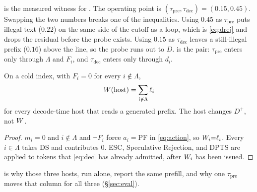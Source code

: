  is the measured witness for .
The operating point is $(\tau_{\mathrm{pre}},\tau_{\mathrm{dec}})=(0.15,0.45)$.
Swapping the two numbers breaks one of the inequalities.
Using $0.45$ as $\tau_{\mathrm{pre}}$ puts illegal text ($0.22$) on the same side of the cutoff as a loop, which is \eqref{eq:drej} and drops the residual before the probe exists.
Using $0.15$ as $\tau_{\mathrm{dec}}$ leaves a still-illegal prefix ($0.16$) above the line, so the probe runs out to $D$.
 is the pair: $\tau_{\mathrm{pre}}$ enters only through $\Lambda$ and $F_i$, and $\tau_{\mathrm{dec}}$ enters only through $d_i$.

\begin{proposition}
\label{prop:host}
On a cold index, with $F_i{=}0$ for every $i\notin\Lambda$,
\begin{equation}
\label{eq:host}
W(\mathrm{host})=\sum_{i\notin\Lambda}\ell_i
\end{equation}
for every decode-time host that reads a generated prefix.
The host changes $D^{+}$, not $W$.
\end{proposition}

\begin{proof}
$m_i{=}0$ and $i\notin\Lambda$ and $\neg F_i$ force $a_i{=}\mathrm{PF}$ in \eqref{eq:action}, so $W_i{=}\ell_i$.
Every $i\in\Lambda$ takes $\mathrm{DS}$ and contributes $0$.
ESC, Speculative Rejection, and DPTS are applied to tokens that \eqref{eq:dec} has already admitted, after $W_i$ has been issued.
\end{proof}

\noindent
{} is why those three hosts, run alone, report the same prefill, and why one $\tau_{\mathrm{pre}}$ moves that column for all three (\S\ref{sec:eval}).


